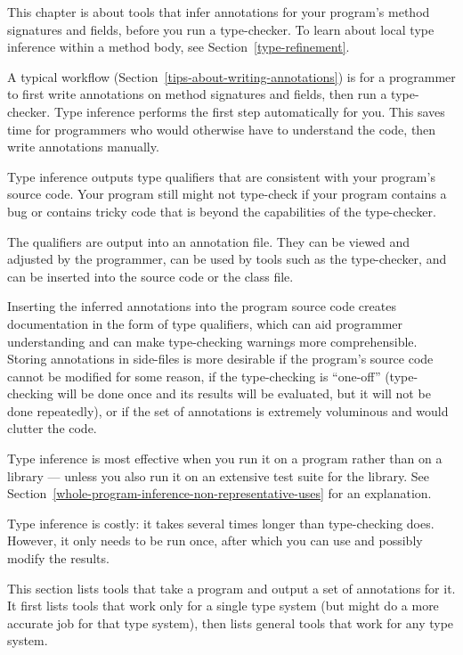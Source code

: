 
This chapter is about tools that infer annotations for your
program's method signatures and fields, before you run a type-checker.
To learn about local type inference within a method body,
see Section~\ref{type-refinement}.

A typical workflow (Section~\ref{tips-about-writing-annotations}) is for a
programmer to first write annotations on method signatures and fields, then
run a type-checker.  Type inference performs the first step automatically
for you.  This saves time for programmers who would otherwise have to
understand the code, then write annotations manually.

Type inference outputs type qualifiers that are consistent with your
program's source code.  Your program still might not type-check if your
program contains a bug or contains tricky code that is beyond the
capabilities of the type-checker.

The qualifiers are output into an annotation file.  They can be viewed and
adjusted by the programmer, can be used by tools such as the type-checker,
and can be inserted into the source code or the class file.

Inserting the inferred annotations into the program source code creates documentation in the form of type
qualifiers, which can aid programmer understanding and can make
type-checking warnings more comprehensible.
Storing annotations in side-files is more desirable if the program's source code cannot
be modified for some reason, if the type-checking is ``one-off'' (type-checking will
be done once and its results will be evaluated, but it will not be done
repeatedly), or if the set of annotations is extremely voluminous and would
clutter the code.


Type inference is most effective when you run it on a program rather than
on a library --- unless you also run it on an extensive test suite for the
library.  See Section~\ref{whole-program-inference-non-representative-uses}
for an explanation.


Type inference is costly:  it takes several times longer than
type-checking does.  However, it only needs to be run once, after which
you can use and possibly modify the results.



This section lists tools that take a program and output a set of
annotations for it.
It first lists tools that work only for a single type system (but might do a
more accurate job for that type system),
then lists general tools that work for any type system.

